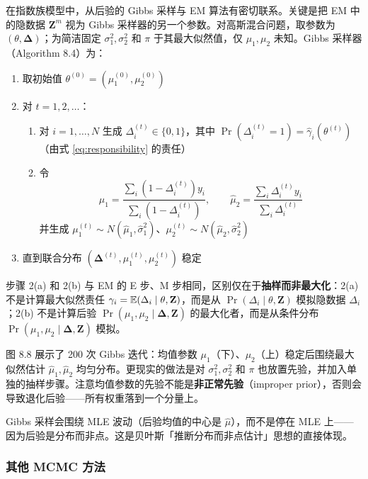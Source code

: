 在指数族模型中，从后验的 Gibbs 采样与 EM 算法有密切联系。关键是把 EM 中的隐数据 $\mathbf{Z}^m$ 视为 Gibbs 采样器的另一个参数。对高斯混合问题，取参数为 $(\theta, \bm{\Delta})$；为简洁固定 $\sigma_1^2, \sigma_2^2$ 和 $\pi$ 于其最大似然值，仅 $\mu_1, \mu_2$ 未知。Gibbs 采样器（Algorithm 8.4）为：

\begin{enumerate}
    \item 取初始值 $\theta^{(0)} = (\mu_1^{(0)}, \mu_2^{(0)})$
    \item 对 $t = 1, 2, \ldots$：
    \begin{enumerate}
        \item[(a)] 对 $i = 1, \ldots, N$ 生成 $\Delta_i^{(t)} \in \{0, 1\}$，其中 $\Pr(\Delta_i^{(t)} = 1) = \hat{\gamma}_i(\theta^{(t)})$（由式 \eqref{eq:responsibility} 的责任）
        \item[(b)] 令
        \[
            \hat{\mu}_1 = \frac{\sum_i (1-\Delta_i^{(t)})y_i}{\sum_i (1-\Delta_i^{(t)})},\qquad
            \hat{\mu}_2 = \frac{\sum_i \Delta_i^{(t)}y_i}{\sum_i \Delta_i^{(t)}}
        \]
        并生成 $\mu_1^{(t)} \sim N(\hat{\mu}_1, \hat{\sigma}_1^2)$、$\mu_2^{(t)} \sim N(\hat{\mu}_2, \hat{\sigma}_2^2)$
    \end{enumerate}
    \item 直到联合分布 $(\bm{\Delta}^{(t)}, \mu_1^{(t)}, \mu_2^{(t)})$ 稳定
\end{enumerate}

步骤 2(a) 和 2(b) 与 EM 的 E 步、M 步相同，区别仅在于\textbf{抽样而非最大化}：2(a) 不是计算最大似然责任 $\gamma_i = \mathbb{E}(\Delta_i \mid \theta, \mathbf{Z})$，而是从 $\Pr(\Delta_i \mid \theta, \mathbf{Z})$ 模拟隐数据 $\Delta_i$；2(b) 不是计算后验 $\Pr(\mu_1, \mu_2 \mid \bm{\Delta}, \mathbf{Z})$ 的最大化者，而是从条件分布 $\Pr(\mu_1, \mu_2 \mid \bm{\Delta}, \mathbf{Z})$ 模拟。

图 8.8 展示了 200 次 Gibbs 迭代：均值参数 $\mu_1$（下）、$\mu_2$（上）稳定后围绕最大似然估计 $\hat{\mu}_1, \hat{\mu}_2$ 均匀分布。更现实的做法是对 $\sigma_1^2, \sigma_2^2$ 和 $\pi$ 也放置先验，并加入单独的抽样步骤。注意均值参数的先验不能是\textbf{非正常先验}（improper prior），否则会导致退化后验——所有权重落到一个分量上。

\begin{remark}
    Gibbs 采样会围绕 MLE 波动（后验均值的中心是 $\hat{\mu}$），而不是停在 MLE 上——因为后验是分布而非点。这是贝叶斯「推断分布而非点估计」思想的直接体现。
\end{remark}

\subsubsection{其他 MCMC 方法}

